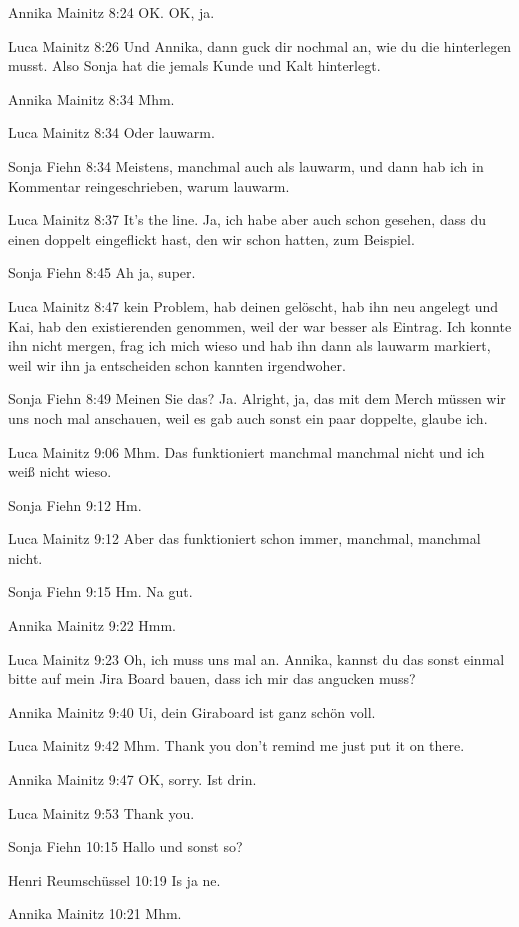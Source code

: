 Annika Mainitz   8:24
OK.
OK, ja.

Luca Mainitz   8:26
Und Annika, dann guck dir nochmal an, wie du die hinterlegen musst. Also Sonja hat die jemals Kunde und Kalt hinterlegt.

Annika Mainitz   8:34
Mhm.

Luca Mainitz   8:34
Oder lauwarm.

Sonja Fiehn   8:34
Meistens, manchmal auch als lauwarm, und dann hab ich in Kommentar reingeschrieben, warum lauwarm.

Luca Mainitz   8:37
It's the line.
Ja, ich habe aber auch schon gesehen, dass du einen doppelt eingeflickt hast, den wir schon hatten, zum Beispiel.

Sonja Fiehn   8:45
Ah ja, super.

Luca Mainitz   8:47
kein Problem, hab deinen gelöscht, hab ihn neu angelegt und Kai, hab den existierenden genommen, weil der war besser als Eintrag. Ich konnte ihn nicht mergen, frag ich mich wieso und hab ihn dann als lauwarm markiert, weil wir ihn ja entscheiden schon kannten irgendwoher.

Sonja Fiehn   8:49
Meinen Sie das?
Ja.
Alright, ja, das mit dem Merch müssen wir uns noch mal anschauen, weil es gab auch sonst ein paar doppelte, glaube ich.

Luca Mainitz   9:06
Mhm.
Das funktioniert manchmal manchmal nicht und ich weiß nicht wieso.

Sonja Fiehn   9:12
Hm.

Luca Mainitz   9:12
Aber das funktioniert schon immer, manchmal, manchmal nicht.

Sonja Fiehn   9:15
Hm.
Na gut.

Annika Mainitz   9:22
Hmm.

Luca Mainitz   9:23
Oh, ich muss uns mal an.
Annika, kannst du das sonst einmal bitte auf mein Jira Board bauen, dass ich mir das angucken muss?

Annika Mainitz   9:40
Ui, dein Giraboard ist ganz schön voll.

Luca Mainitz   9:42
Mhm.
Thank you don't remind me just put it on there.

Annika Mainitz   9:47
OK, sorry.
Ist drin.

Luca Mainitz   9:53
Thank you.

Sonja Fiehn   10:15
Hallo und sonst so?

Henri Reumschüssel   10:19
Is ja ne.

Annika Mainitz   10:21
Mhm.

